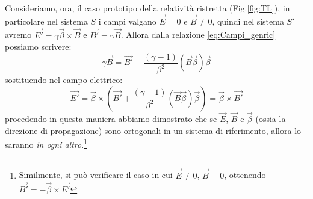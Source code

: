 Consideriamo, ora, il caso prototipo della relatività ristretta (Fig.\ref{fig:TL}), in particolare nel sistema $S$ i campi valgano $\Vec{E}=0$ e $\Vec{B}\neq0$, quindi nel sistema $S'$ avremo $\Vec{E'}=\gamma\Vec{\beta}\times\Vec{B}$ e $\Vec{B'}=\gamma\Vec{B}$. Allora dalla relazione \eqref{eq:Campi_genric} possiamo scrivere:\begin{equation*}
    \gamma\Vec{B}=\Vec{B'}+\dfrac{(\gamma -1)}{\beta^2}(\Vec{B}\Vec{\beta})\Vec{\beta}
\end{equation*}
sostituendo  nel campo elettrico:
\begin{equation*}
    \Vec{E'}=\Vec{\beta}\times\left(\Vec{B'}+\dfrac{(\gamma -1)}{\beta^2}(\Vec{B}\Vec{\beta})\Vec{\beta}\right)=\Vec{\beta}\times\Vec{B'}
\end{equation*}
procedendo in questa maniera abbiamo dimostrato che se $\Vec{E}$, $\Vec{B}$ e $\Vec{\beta}$ (ossia la direzione di propagazione) sono ortogonali in un sistema di riferimento, allora lo saranno \textit{in ogni altro}.\footnote{Similmente, si può verificare il caso in cui $\Vec{E}\neq0$, $\Vec{B}=0$, ottenendo$\Vec{B'}=-\Vec{\beta}\times\Vec{E'}$}

